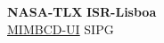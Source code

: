 \documentclass{article}
\begin{document}
\noindent
\large\textbf{NASA-TLX} \hfill \textbf{ISR-Lisboa} \\
\normalsize
\hyperlink{https://mimbcd-ui.github.io/}{MIMBCD-UI} \hfill SIPG \\



\clearpage


\end{document}
